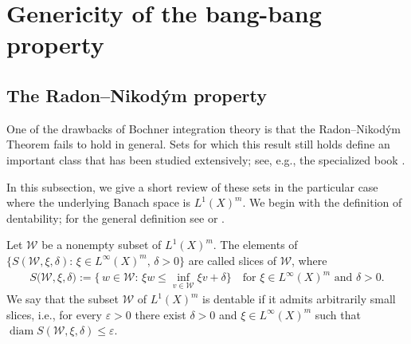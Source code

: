 \documentclass[hidelinks,onefignum,onetabnum]{siamart220329}
\newcommand{\diam}{\operatorname{diam}}
\begin{document}



\section{Genericity of the bang-bang property}\label{Genericity}



\subsection{The Radon--Nikod\'ym property}
One of the drawbacks of Bochner integration theory is that the Radon–Nikod\'ym Theorem fails to hold in general.  Sets for which this result still holds define an important class  that has been studied extensively; see, e.g., the specialized book \cite{GeoRNP}. 


In this subsection, we give a short review of these sets in the particular case where the underlying Banach space is ${L^1(X)^m}$. We begin with the definition of dentability; for the general definition  see \cite[Definition 6.3.2]{VarTech} or \cite[Section 1.7.1]{Penot2013}.
\begin{definition}
	Let $\mathcal W$ be a nonempty subset of  ${L^1(X)^m}$. The elements of  $\{S(\mathcal W,\xi,\delta):\, \xi\in {L^\infty(X)^m},\,\delta>0\}$ are called slices of $\mathcal W$, where  
	\begin{align*}
		S\big(\mathcal W,\xi,\delta\big):=\{\,w\in\mathcal W: \,  \xi w\le \inf_{v\in\mathcal W}\xi v+\delta\}\quad \text{for $\xi\in {L^\infty(X)^m}$ and $\delta>0$}.
	\end{align*}
	We say that the subset $\mathcal W$ of $L^1(X)^m$ is dentable if it admits arbitrarily small slices, i.e., 
	 for every $\varepsilon>0$ there exist $\delta>0$ and $\xi\in {L^\infty(X)^m}$ such that $\diam S(\mathcal W,\xi,\delta)\le\varepsilon$.
\end{definition}

\end{document}
